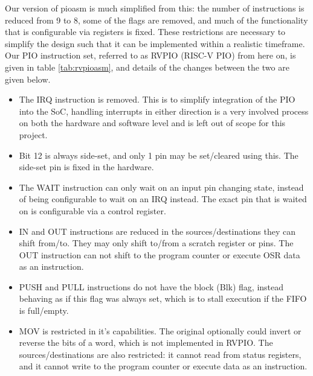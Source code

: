 Our version of pioasm is much simplified from this: the number of instructions is reduced from 9 to 8, some of the flags are removed, and much of the functionality that is configurable via registers is fixed. These restrictions are necessary to simplify the design such that it can be implemented within a realistic timeframe. Our PIO instruction set, referred to as RVPIO (RISC-V PIO) from here on, is given in table \ref{tab:rvpioasm}, and details of the changes between the two are given below.

\begin{itemize}
    \item The IRQ instruction is removed. This is to simplify integration of the PIO into the SoC, handling interrupts in either direction is a very involved process on both the hardware and software level and is left out of scope for this project.
    \item Bit 12 is always side-set, and only 1 pin may be set/cleared using this. The side-set pin is fixed in the hardware.
    \item The WAIT instruction can only wait on an input pin changing state, instead of being configurable to wait on an IRQ instead. The exact pin that is waited on is configurable via a control register.
    \item IN and OUT instructions are reduced in the sources/destinations they can shift from/to. They may only shift to/from a scratch register or pins. The OUT instruction can not shift to the program counter or execute OSR data as an instruction.
    \item PUSH and PULL instructions do not have the block (Blk) flag, instead behaving as if this flag was always set, which is to stall execution if the FIFO is full/empty.
    \item MOV is restricted in it's capabilities. The original optionally could invert or reverse the bits of a word, which is not implemented in RVPIO. The sources/destinations are also restricted: it cannot read from status registers, and it cannot write to the program counter or execute data as an instruction.
\end{itemize}

